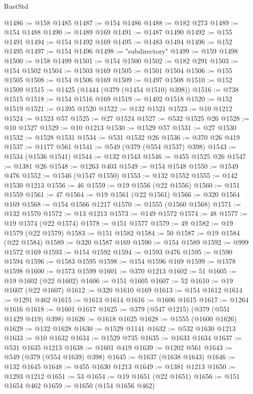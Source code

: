\begin{lexlean}{RustStd}
\begin{coremodule}
@1486 := @158 @1485
@1487 := @154 @1486
@1488 := @182 @273
@1489 := @154 @1488
@1490 := @1489 @169
@1491 := @1487 @1490
@1492 := @155 @1491
@1494 := @154 @1492 @169
@1495 := @1483 @1494
@1496 := @152 @1495
@1497 := @154 @1496
@1498 := "subdirectory"
@1499 := @159 @1498
@1500 := @158 @1499
@1501 := @154 @1500
@1502 := @182 @291
@1503 := @154 @1502
@1504 := @1503 @169
@1505 := @1501 @1504
@1506 := @155 @1505
@1508 := @154 @1506 @169
@1509 := @1497 @1508
@1510 := @152 @1509
@1515 := @1425 (@1444 (@379 (@1454 @1510) @398))
@1516 := @738 @1515
@1518 := @154 @1516 @169
@1519 := @1402 @1518
@1520 := @152 @1519
@1521 := @1395 @1520
@1522 := @132 @1521
@1523 := @10 @1212
@1524 := @1523 @57
@1525 := @27 @1524
@1527 := @532 @1525 @26
@1528 := @10 @1527
@1529 := @10 @1213
@1530 := @1529 @57
@1531 := @27 @1530
@1532 := @1528 @1531
@1534 := @531 @1532 @26
@1536 := @370 @26 @419
@1537 := @1177 @561
@1541 := @549 (@379 (@554 @1537) @398)
@1543 := @1534 (@1536 @1541)
@1544 := @132 @1543
@1546 := @455 @1525 @26
@1547 := @1381 @26
@1548 := @1263 @403
@1549 := @154 @1548
@1550 := @1549 @476
@1552 := @1546 (@1547 @1550)
@1553 := @132 @1552
@1555 := @142 @1530 @1213
@1556 := 46
@1559 := @19 @1556 (@22 @1556)
@1560 := @151 @1559
@1561 := 47
@1564 := @19 @1561 (@22 @1561)
@1566 := @320 @1564 @169
@1568 := @154 @1566 @1217
@1570 := @1555 (@1560 @1568)
@1571 := @132 @1570
@1572 := @13 @1213
@1573 := @149 @1572
@1574 := 48
@1577 := @19 @1574 (@22 @1574)
@1578 := @151 @1577
@1579 := 49
@1582 := @19 @1579 (@22 @1579)
@1583 := @151 @1582
@1584 := 50
@1587 := @19 @1584 (@22 @1584)
@1589 := @320 @1587 @169
@1590 := @154 @1589
@1592 := @999 @1572 @169
@1593 := @154 @1592
@1594 := @1593 @476
@1595 := @1590 @1594
@1596 := @1583 @1595
@1598 := @154 @1596 @169
@1599 := @1578 @1598
@1600 := @1573 @1599
@1601 := @370 @1213
@1602 := 51
@1605 := @19 @1602 (@22 @1602)
@1606 := @151 @1605
@1607 := 52
@1610 := @19 @1607 (@22 @1607)
@1612 := @320 @1610 @169
@1613 := @154 @1612
@1614 := @1291 @462
@1615 := @1613 @1614
@1616 := @1606 @1615
@1617 := @1264 @1616
@1618 := @1601 @1617
@1625 := @379 (@547 @1215) (@379 (@551 @1429 @419) @398)
@1626 := @1618 @1625
@1628 := @1555 (@1600 @1626)
@1629 := @132 @1628
@1630 := @1529 @1141
@1632 := @532 @1630 @1213
@1633 := @10 @1632
@1634 := @1529 @735
@1635 := @1633 @1634
@1637 := @531 @1635 @1213
@1638 := @1601 @419
@1639 := @1202 @561
@1643 := @549 (@379 (@554 @1639) @398)
@1645 := @1637 (@1638 @1643)
@1646 := @132 @1645
@1648 := @455 @1630 @1213
@1649 := @1381 @1213
@1650 := @1293 @1212
@1651 := 53
@1654 := @19 @1651 (@22 @1651)
@1656 := @151 @1654 @462
@1659 := @1650 (@154 @1656 @462)

\end{coremodule}
\end{lexlean}
